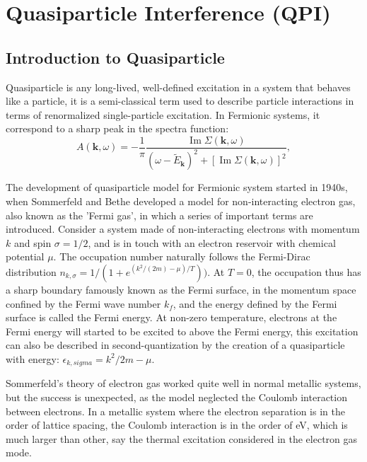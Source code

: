 \chapter{Quasiparticle Interference (QPI)}

\section{Introduction to Quasiparticle}
Quasiparticle is any long-lived, well-defined excitation in a system that behaves like a particle, it is a semi-classical term used to describe particle interactions in terms of renormalized single-particle excitation. In Fermionic systems, it correspond to a sharp peak in the spectra function: 
	\[
	A(\mathbf{k}, \omega) = -\frac{1}{\pi} \frac{\operatorname{Im} \Sigma(\mathbf{k}, \omega)}{(\omega - \tilde{E}_{\mathbf{k}})^2 + [\operatorname{Im} \Sigma(\mathbf{k}, \omega)]^2},
	\]

The development of quasiparticle model for Fermionic system started in 1940s, when Sommerfeld and Bethe\cite{SommerfeldBethe1933} developed a model for non-interacting electron gas, also known as the 'Fermi gas', in which a series of important terms are introduced. Consider a system made of non-interacting electrons with momentum $k$ and spin $\sigma = 1/2$, and is in touch with an electron reservoir with chemical potential $\mu$. The occupation number naturally follows the Fermi-Dirac distribution $n_{k,\sigma}=1/(1+e^{(k^2/(2m)-\mu)/T}))$. At $T=0$, the occupation thus has a sharp boundary famously known as the Fermi surface, in the momentum space confined by the Fermi wave number $k_f$, and the energy defined by the Fermi surface is called the Fermi energy. At non-zero temperature, electrons at the Fermi energy will started to be excited to above the Fermi energy, this excitation can also be described in second-quantization by the creation of a quasiparticle with energy: $\epsilon_{k,sigma} = k^2/2m - \mu$. 

Sommerfeld's theory of electron gas worked quite well in normal metallic systems, but the success is unexpected, as the model neglected the Coulomb interaction between electrons. In a metallic system where the electron separation is in the order of lattice spacing, the Coulomb interaction is in the order of eV, which is much larger than other, say the thermal excitation considered in the electron gas mode. 

